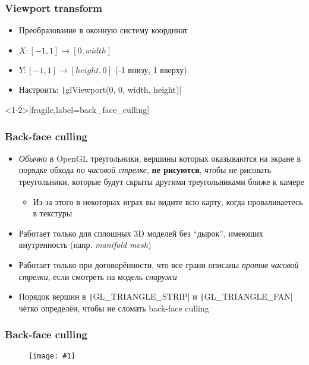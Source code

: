 \documentclass[10pt]{beamer}
\newcommand{\slideimage}[1]{
  \begin{figure}
    \begin{adjustbox}{width=\textwidth, totalheight=\textheight-2\baselineskip-2\baselineskip,keepaspectratio}
      \texttt{[image: \#1]}
    \end{adjustbox}
  \end{figure}
}
\begin{document}
\begin{frame}[fragile]
\frametitle{Viewport transform}
\begin{itemize}
\item Преобразование в оконную систему координат
\item \begin{math}X: [-1, 1] \rightarrow [0, width]\end{math}
\item \begin{math}Y: [-1, 1] \rightarrow [height, 0]\end{math} (-1 внизу, 1 вверху)
\pause
\item Настроить: \texttt|glViewport(0, 0, width, height)|
\end{itemize}
\end{frame}

\begin{frame}<1-2>[fragile,label=back_face_culling]
\frametitle{Back-face culling}
\begin{itemize}
\item \textit{Обычно} в OpenGL треугольники, вершины которых оказываются на экране в порядке обхода \textit{по часовой стрелке}, \alert{\textbf{не рисуются}}, чтобы не рисовать треугольники, которые будут скрыты другими треугольниками ближе к камере
\pause
\begin{itemize}
\item Из-за этого в некоторых играх вы видите всю карту, когда проваливаетесь в текстуры
\end{itemize}
\pause
\item Работает только для сплошных 3D моделей без ``дырок'', имеющих внутренность (напр. \textit{manifold mesh})
\pause
\item Работает только при договорённости, что все грани описаны \textit{против часовой стрелки}, если смотреть на модель \textit{снаружи}
\pause
\item Порядок вершин в \texttt|GL_TRIANGLE_STRIP| и \texttt|GL_TRIANGLE_FAN| чётко определён, чтобы не сломать back-face culling
\end{itemize}
\end{frame}

\begin{frame}
\frametitle{Back-face culling}
\slideimage{back-face-culling.png}
\end{frame}

\end{document}
